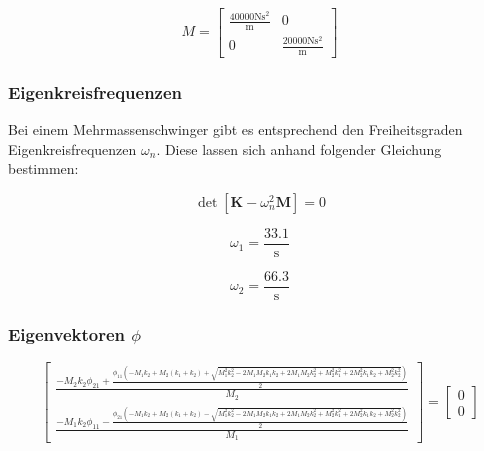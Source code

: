 \documentclass[
  letterpaper,
  DIV=11]{scrreprt}
\begin{document}
\begin{equation}M = \left[\begin{matrix}\frac{40000 \text{N} \text{s}^{2}}{\text{m}} & 0\\0 & \frac{20000 \text{N} \text{s}^{2}}{\text{m}}\end{matrix}\right]\end{equation}

\hypertarget{eigenkreisfrequenzen-1}{%
\subsubsection{Eigenkreisfrequenzen}\label{eigenkreisfrequenzen-1}}

Bei einem Mehrmassenschwinger gibt es entsprechend den Freiheitsgraden
Eigenkreisfrequenzen \(\omega_n\). Diese lassen sich anhand folgender
Gleichung bestimmen:

\[\det{[\mathbf{K}-\omega_n^2 \mathbf{M}]=0}\]

\begin{equation}\omega_{1} = \frac{33.1}{\text{s}}\end{equation}

\begin{equation}\omega_{2} = \frac{66.3}{\text{s}}\end{equation}

\hypertarget{eigenvektoren-phi}{%
\subsubsection{\texorpdfstring{Eigenvektoren
\(\phi\)}{Eigenvektoren \textbackslash phi}}\label{eigenvektoren-phi}}

\begin{equation}\left[\begin{matrix}\frac{- M_{2} k_{2} \phi_{21} + \frac{\phi_{11} \left(- M_{1} k_{2} + M_{2} \left(k_{1} + k_{2}\right) + \sqrt{M_{1}^{2} k_{2}^{2} - 2 M_{1} M_{2} k_{1} k_{2} + 2 M_{1} M_{2} k_{2}^{2} + M_{2}^{2} k_{1}^{2} + 2 M_{2}^{2} k_{1} k_{2} + M_{2}^{2} k_{2}^{2}}\right)}{2}}{M_{2}}\\\frac{- M_{1} k_{2} \phi_{11} - \frac{\phi_{21} \left(- M_{1} k_{2} + M_{2} \left(k_{1} + k_{2}\right) - \sqrt{M_{1}^{2} k_{2}^{2} - 2 M_{1} M_{2} k_{1} k_{2} + 2 M_{1} M_{2} k_{2}^{2} + M_{2}^{2} k_{1}^{2} + 2 M_{2}^{2} k_{1} k_{2} + M_{2}^{2} k_{2}^{2}}\right)}{2}}{M_{1}}\end{matrix}\right] = \left[\begin{matrix}0\\0\end{matrix}\right]\end{equation}
\end{document}

